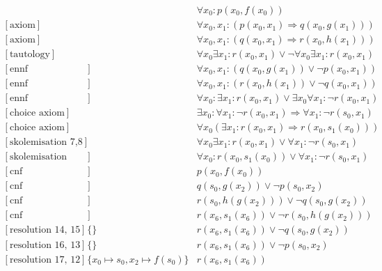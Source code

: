 \documentclass[onehalfspacing]{article}
\theoremstyle{definition}
\theoremstyle{definition}
\theoremstyle{definition}
\theoremstyle{definition}
\theoremstyle{definition}
\theoremstyle{definition}
\begin{document}
\setcounter{equation}{0}
\begin{align}
	[\text{axiom}] && \forall x_0: p(x_0,f(x_0))\\
	[\text{axiom}] && \forall x_0, x_1 : (p(x_0,x_1) \Rightarrow q(x_0,g(x_1)))\\
	[\text{axiom}] && \forall x_0, x_1 : (q(x_0,x_1) \Rightarrow r(x_0,h(x_1)))\\
	[\text{tautology}] &&\forall  x_0 \exists x_1 : r(x_0,x_1)\vee \neg\forall  x_0 \exists x_1 : r(x_0,x_1)\\
	[\text{ennf transformation 2}] && \forall x_0, x_1 : (q(x_0,g(x_1)) \vee \neg p(x_0,x_1)) \\
	[\text{ennf transformation 3}] &&\forall x_0, x_1 : (r(x_0,h(x_1)) \vee \neg q(x_0, x_1)) \\
	[\text{ennf transformation 4}] && \forall  x_0 : \exists x_1 : r(x_0,x_1)\vee \exists x_0 \forall x_1 : \neg r(x_0, x_1)\\
	[\text{choice axiom}] && \exists x_0 : \forall x_1 : \neg r(x_0, x_1) \Rightarrow \forall x_1 : \neg r(s_0,x_1)\\
	[\text{choice axiom}] &&\forall x_0(\exists x_1: r(x_0, x_1)\Rightarrow r(x_0, s_1(x_0)))\\
	[\text{skolemisation 7,8}] && \forall  x_0 \exists x_1 : r(x_0,x_1)\vee \forall x_1 : \neg r(s_0, x_1)\\
	[\text{skolemisation 9,10}] && \forall  x_0 :  r(x_0, s_1(x_0))\vee \forall x_1 : \neg r(s_0, x_1)\\
	[\text{cnf transformation 1}] && p(x_0,f(x_0))\\
	[\text{cnf transformation 5}] && q(s_0,g(x_2)) \vee \neg p(s_0, x_2)\\
	[\text{cnf transformation 6}] && r(s_0,h(g(x_2))) \vee \neg q(s_0, g(x_2))\\
	[\text{cnf transformation 11}] && r(x_6, s_1(x_6))\vee\neg r(s_0,h(g(x_2)))\\
	[\text{resolution 14, 15}] &\{\}&r(x_6, s_1(x_6))\vee\neg q(s_0,g(x_2))\\
	[\text{resolution 16, 13}] &\{\}&r(x_6, s_1(x_6))\vee\neg p(s_0,x_2)\\
	[\text{resolution 17, 12}] &\{x_0\mapsto s_0, x_2\mapsto f(s_0)\}&r(x_6, s_1(x_6))
\end{align}
\end{document}
